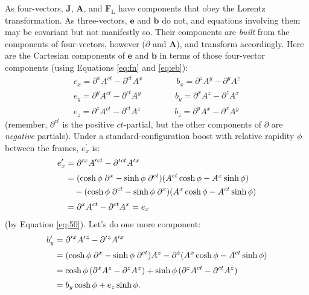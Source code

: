\documentclass[12pt]{article}
\renewcommand{\vv}[1]{\mathbf{#1}}
\begin{document}
As four-vectors, $\vv J$, $\vv A$, and $\vv F_{\mathrm{L}}$ have components that obey the Lorentz transformation. As three-vectors, $\vv e$ and $\vv b$ do not, and equations involving them may be covariant but not manifestly so. Their components are \emph{built} from the components of four-vectors, however ($\partialup$ and $\vv A$), and transform accordingly. Here are the Cartesian components of $\vv e$ and $\vv b$ in terms of those four-vector components (using Equations \ref{eq:fn} and \ref{eq:eb}):
\begin{equation}\label{eq:ebc}
\begin{aligned}
e_x = \partial^x A^{ct} - \partial^{ct} A^x \qquad \qquad b_x = \partial^z A^y - \partial^y A^z \\
e_y = \partial^y A^{ct} - \partial^{ct} A^y \qquad \qquad b_y = \partial^x A^z - \partial^z A^x \\
e_z = \partial^z A^{ct} - \partial^{ct} A^z \qquad \qquad b_z = \partial^y A^x - \partial^x A^y 
\end{aligned}
\end{equation}
(remember, $\partial^{ct}$ is the positive $ct$-partial, but the other components of $\partialup$ are \emph{negative} partials). Under a standard-configuration boost with relative rapidity $\phi$ between the frames, $e^\prime_x$ is:
\begin{equation*}
\begin{split}
e^\prime_x &= \partial^{\mkern.5mu \prime \mkern1mu x} A^{\prime \mkern1mu ct} - \partial^{\mkern.5mu \prime \mkern1mu ct} A^{\prime \mkern1mu x} \\[2pt]
&= (\cosh{\phi} \; \partial^x  - \sinh{\phi} \; \partial^{ct} )(A^{ct} \cosh{\phi}  - A^x \sinh{\phi} ) \\
& \quad - (\cosh{\phi} \; \partial^{ct} -  \sinh{\phi} \; \partial^x )(A^x \cosh{\phi} - A^{ct} \sinh{\phi} ) \\[2pt]
&= \partial^x A^{ct} - \partial^{ct} A^x = e_x
\end{split}
\end{equation*}
(by Equation \ref{eq:50}). Let's do one more component:
\begin{equation*}
\begin{split}
b^\prime_y &= \partial^{\mkern.5mu \prime \mkern1mu x} A^{\prime \mkern1mu z} - \partial^{\mkern.5mu \prime \mkern1mu z} A^{\prime \mkern1mu x} \\[2pt]
&= (\cosh{\phi} \; \partial^x  - \sinh{\phi} \; \partial^{ct} ) A^z - \partial^z (A^x \cosh{\phi} - A^{ct} \sinh{\phi} ) \\[2pt]
&= \cosh{\phi} \, (\partial^x A^z - \partial^z A^x) + \sinh{\phi} \, (\partial^z A^{ct} - \partial^{ct} A^z) \\[2pt]
&= b_y \cosh{\phi} + e_z \sinh{\phi} .
\end{split}
\end{equation*}
\end{document}
